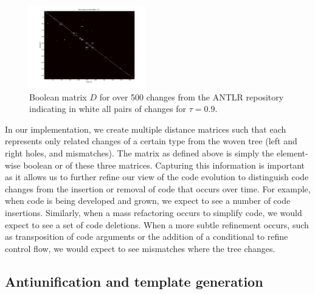 \begin{figure}
\begin{center}
\includegraphics[width=0.45\textwidth]{figures/distmatrix-0-9.png}
\caption{Boolean matrix $D$ for over 500 changes from the ANTLR repository indicating in white all pairs of
changes for $\tau = 0.9$.}
\label{fig:boolmat}
\end{center}
\end{figure}

In our implementation, we create multiple distance matrices such that each
represents only related changes of a certain type from the woven tree (left
and right holes, and mismatches).  The matrix as defined above is simply the
element-wise boolean or of these three matrices.  Capturing this information is
important as it allows us to further refine our view of the code evolution to
distinguish code changes from the insertion or removal of code that occurs
over time. For example, when code is being developed and grown, we expect to
see a number of code insertions. Similarly, when a mass refactoring occurs to
simplify code, we would expect to see a set of code deletions.  When a more
subtle refinement occurs, such as transposition of code arguments or the
addition of a conditional to refine control flow, we would expect to see
mismatches where the tree changes.


\subsection{Antiunification and template generation}

